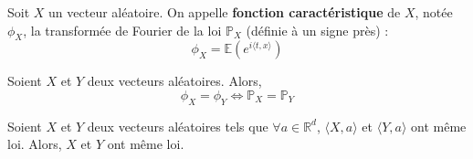 
	\begin{definition}
		Soit $X$ un vecteur aléatoire. On appelle \textbf{fonction caractéristique} de $X$, notée $\phi_X$, la transformée de Fourier de la loi $\mathbb{P}_X$ (définie à un signe près) :
		\[ \phi_X = \mathbb{E}(e^{i \langle t, x \rangle}) \]
	\end{definition}

	\begin{theorem}
		Soient $X$ et $Y$ deux vecteurs aléatoires. Alors,
		\[ \phi_X = \phi_Y \iff \mathbb{P}_X = \mathbb{P}_Y \]
	\end{theorem}

	\begin{corollary}
		Soient $X$ et $Y$ deux vecteurs aléatoires tels que $\forall a \in \mathbb{R}^d$, $\langle X, a \rangle$ et $\langle Y, a \rangle$ ont même loi. Alors, $X$ et $Y$ ont même loi.
	\end{corollary}

